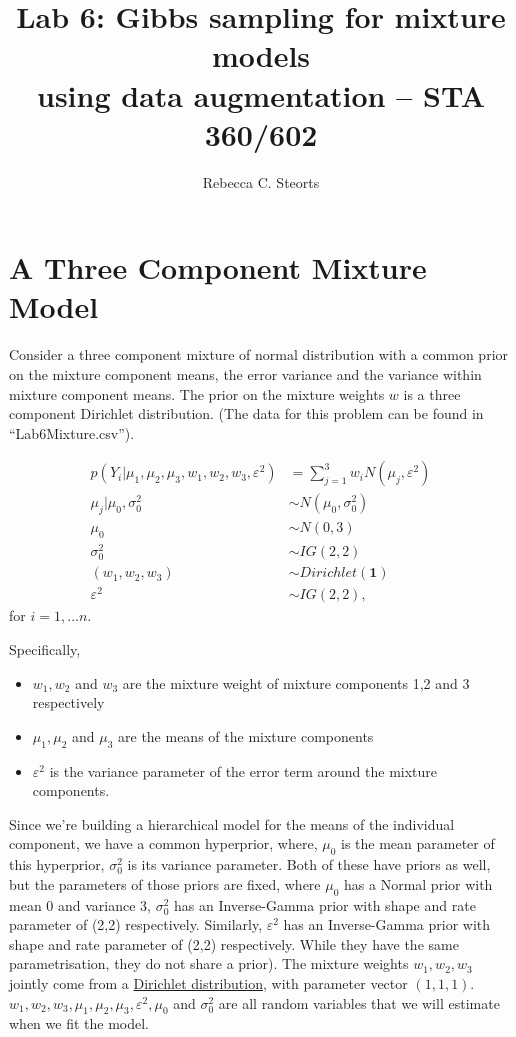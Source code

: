 \documentclass{article}
\title{Lab 6: Gibbs sampling for mixture models \\using data augmentation -- STA 360/602}
\author{Rebecca C. Steorts}
\begin{document}
\maketitle
\section*{A Three Component Mixture Model}

Consider a three component mixture of normal distribution with a common prior on the mixture component means, the error variance and the variance within mixture component means. The prior on the mixture weights $w$ is a three component Dirichlet distribution. (The data for this problem can be found in ``Lab6Mixture.csv'').

\begin{align*}
p(Y_i | \mu_1,\mu_2,\mu_3,w_1,w_2,w_3,\varepsilon^2) &= \sum_{j=1}^3 w_i N(\mu_j,\varepsilon^2)\\
\mu_j|\mu_0,\sigma_0^2 &\sim N(\mu_0,\sigma_0^2)\\
\mu_0 &\sim N(0,3)\\
\sigma_0^2 &\sim IG(2,2)\\
(w_1,w_2,w_3) &\sim Dirichlet(\mathbf{1})\\
\varepsilon^2 &\sim IG(2,2),
\end{align*}
for $i=1,\ldots n.$

Specifically, 
\begin{itemize}
\item $w_1,w_2$ and $w_3$ are the mixture weight of mixture components 1,2 and 3 respectively
\item $\mu_1,\mu_2$ and $\mu_3$ are the means of the mixture components 
\item $\varepsilon^2$ is the variance parameter of the error term around the mixture components. 
\end{itemize}

Since we're building a hierarchical model for the means of the individual component, we have a common hyperprior, where, $\mu_0$ is the mean parameter of this hyperprior, $\sigma_0^2$ is its variance parameter. Both of these have priors as well, but the parameters of those priors are fixed, where $\mu_0$ has a Normal prior with mean 0 and variance 3, $\sigma_0^2$ has an Inverse-Gamma prior with shape and rate parameter of (2,2) respectively. Similarly, $\varepsilon^2$ has an Inverse-Gamma prior with shape and rate parameter of (2,2) respectively. While they have the same parametrisation, they do not share a prior). The mixture weights $w_1,w_2,w_3$ jointly come from a \href{https://en.wikipedia.org/wiki/Dirichlet_distribution}{Dirichlet distribution}, with parameter vector $(1,1,1)$. $w_1,w_2,w_3,\mu_1,\mu_2,\mu_3,\varepsilon^2,\mu_0$ and $\sigma_0^2$ are all random variables that we will estimate when we fit the model.
\end{document}

